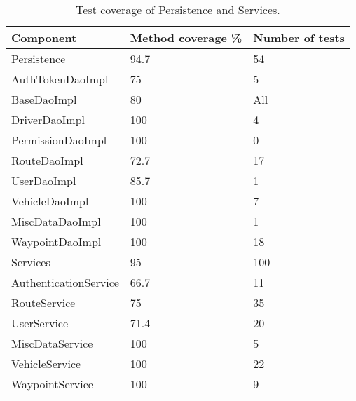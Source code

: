 \begin{table}
    \center
    \begin{tabular}{l|l|l}
        \textbf{Component}      & \textbf{Method coverage \%} & \textbf{Number of tests} \\
        \toprule
        Persistence             & 94.7  & 54 \\
        \toprule
        AuthTokenDaoImpl        & 75    & 5 \\
        BaseDaoImpl             & 80    & All\\
        DriverDaoImpl           & 100   & 4\\
        PermissionDaoImpl       & 100   & 0\\
        RouteDaoImpl            & 72.7  & 17\\
        UserDaoImpl             & 85.7  & 1\\
        VehicleDaoImpl          & 100   & 7\\
        MiscDataDaoImpl         & 100   & 1\\
        WaypointDaoImpl         & 100   & 18\\
        \midrule
        Services                & 95    & 100 \\
        \toprule
        AuthenticationService   & 66.7  & 11 \\
        RouteService            & 75    & 35\\
        UserService             & 71.4  & 20\\
        MiscDataService         & 100   & 5\\
        VehicleService          & 100   & 22\\
        WaypointService         & 100   & 9\\
        \bottomrule
    \end{tabular}
    \caption{Test coverage of Persistence and Services.}\label{tab:test_cov}
\end{table}
